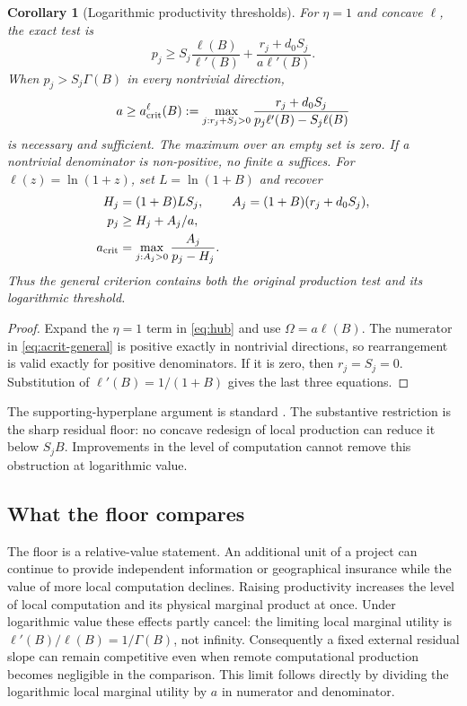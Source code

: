 \documentclass[11pt,a4paper]{article}
\newtheorem{corollary}[proposition]{Corollary}
\theoremstyle{definition}\newtheorem{definition}{Definition}
\begin{document}
\begin{corollary}[Logarithmic productivity thresholds]
\label{lem:production}
\label{prop:threshold}
For $\eta=1$ and concave $\ell$, the exact test is
\begin{equation}
 p_j\geq S_j\frac{\ell(B)}{\ell'(B)}
       +\frac{r_j+d_0S_j}{a\ell'(B)}.
 \label{eq:general-production}
\end{equation}
When $p_j>S_j\Gamma(B)$ in every nontrivial direction,
\begin{equation}
 a\geq a_{\rm crit}^{\ell}(B):=
 \max_{j:r_j+S_j>0}
 \frac{r_j+d_0S_j}{p_j\ell'(B)-S_j\ell(B)}
 \label{eq:acrit-general}
\end{equation}
is necessary and sufficient. The maximum over an empty set is zero.
If a nontrivial denominator is non-positive, no finite $a$ suffices.
For $\ell(z)=\ln(1+z)$, set $L=\ln(1+B)$ and recover
\begin{align}
 H_j&=(1+B)LS_j,& A_j&=(1+B)(r_j+d_0S_j),\label{eq:HA}\\
 p_j&\geq H_j+A_j/a,\label{eq:exact}\\
 a_{\rm crit}&=\max_{j:A_j>0}\frac{A_j}{p_j-H_j}.
 \label{eq:acrit}
\end{align}
Thus the general criterion contains both the original production test
and its logarithmic threshold.
\end{corollary}
\begin{proof}
Expand the $\eta=1$ term in \cref{eq:hub} and use
$\Omega=a\ell(B)$. The numerator in \cref{eq:acrit-general} is
positive exactly in nontrivial directions, so rearrangement is valid
exactly for positive denominators. If it is zero, then $r_j=S_j=0$.
Substitution of $\ell'(B)=1/(1+B)$ gives the last three equations.
\end{proof}

The supporting-hyperplane argument is standard
\citep[chapters 3--5]{BoydVandenberghe2004}. The substantive restriction
is the sharp residual floor: no concave redesign of local production
can reduce it below $S_jB$. Improvements in the level of computation
cannot remove this obstruction at logarithmic value.


\subsection{What the floor compares}
The floor is a relative-value statement. An additional unit of a project
can continue to provide independent information or geographical insurance
while the value of more local computation declines. Raising productivity
increases the level of local computation and its physical marginal product
at once. Under logarithmic value these effects partly cancel: the limiting
local marginal utility is $\ell'(B)/\ell(B)=1/\Gamma(B)$, not infinity.
Consequently a fixed external residual slope can remain competitive even
when remote computational production becomes negligible in the comparison.
This limit follows directly by dividing the logarithmic local marginal
utility by $a$ in numerator and denominator.
\end{document}
